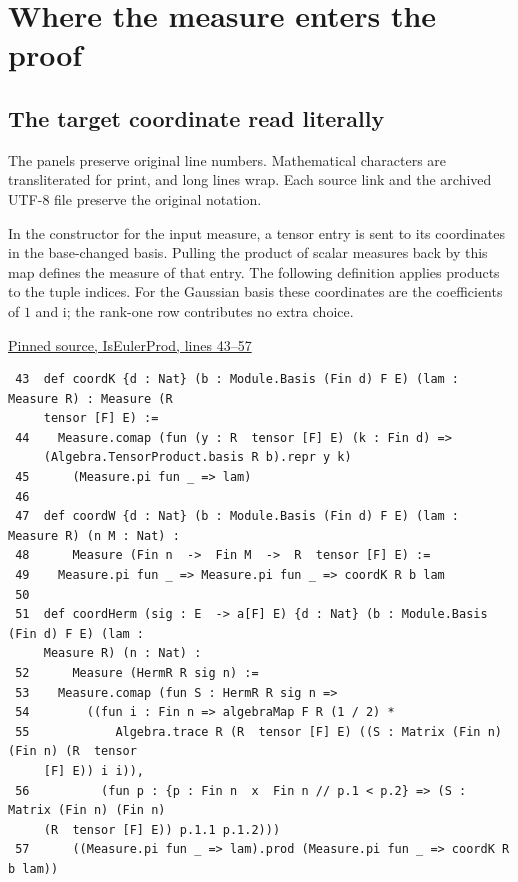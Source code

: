 \documentclass[12pt,letterpaper]{article}
\begin{document}
\clearpage\section{Where the measure enters the proof}\subsection*{The target coordinate read literally}

{\small The panels preserve original line numbers. Mathematical characters are transliterated for print, and long lines wrap. Each source link and the archived UTF-8 file preserve the original notation.}\par

In the constructor for the input measure, a tensor entry is sent to its coordinates in the base-changed basis. Pulling the product of scalar measures back by this map defines the measure of that entry. The following definition applies products to the tuple indices. For the Gaussian basis these coordinates are the coefficients of \(1\) and \(\mathrm i\); the rank-one row contributes no extra choice.

\par\smallskip\href{https://github.com/nousentllc/riemann-hypothesis/blob/40e56bab026552e089d7afcfeff08d2defb9c005/src/CompanionTheory/SpectralGeometry/CountingDefinitions/AdelicEulerProducts/IsEulerProd.lean#L43-L57}{\sffamily\small Pinned source, IsEulerProd, lines 43--57}\par

{\footnotesize\begin{verbatim}
 43  def coordK {d : Nat} (b : Module.Basis (Fin d) F E) (lam : Measure R) : Measure (R
     tensor [F] E) :=
 44    Measure.comap (fun (y : R  tensor [F] E) (k : Fin d) =>
     (Algebra.TensorProduct.basis R b).repr y k)
 45      (Measure.pi fun _ => lam)
 46  
 47  def coordW {d : Nat} (b : Module.Basis (Fin d) F E) (lam : Measure R) (n M : Nat) :
 48      Measure (Fin n  ->  Fin M  ->  R  tensor [F] E) :=
 49    Measure.pi fun _ => Measure.pi fun _ => coordK R b lam
 50  
 51  def coordHerm (sig : E  -> a[F] E) {d : Nat} (b : Module.Basis (Fin d) F E) (lam :
     Measure R) (n : Nat) :
 52      Measure (HermR R sig n) :=
 53    Measure.comap (fun S : HermR R sig n =>
 54        ((fun i : Fin n => algebraMap F R (1 / 2) *
 55            Algebra.trace R (R  tensor [F] E) ((S : Matrix (Fin n) (Fin n) (R  tensor
     [F] E)) i i)),
 56          (fun p : {p : Fin n  x  Fin n // p.1 < p.2} => (S : Matrix (Fin n) (Fin n)
     (R  tensor [F] E)) p.1.1 p.1.2)))
 57      ((Measure.pi fun _ => lam).prod (Measure.pi fun _ => coordK R b lam))
\end{verbatim}
}
\end{document}
